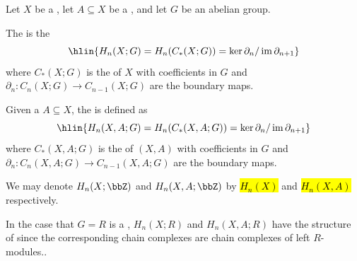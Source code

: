 \begin{definition} \label{definition:singular_homology_and_relative_singular_homology_of_topological_space_with_coefficients_in_an_abelian_group}

Let $X$ be a , let $A \subseteq X$ be a , and let $G$ be an abelian group. 

The  is the 
$$\hlin{H_n(X;G) = H_n(C_*(X;G)) = \ker \partial_n / \operatorname{im} \partial_{n+1}}$$
where $C_*(X;G)$ is the  of $X$ with coefficients in $G$ and $\partial_n: C_n(X;G) \to C_{n-1}(X;G)$ are the boundary maps.

Given a  $A \subseteq X$, the  is defined as
$$\hlin{H_n(X,A;G) = H_n(C_*(X,A;G)) = \ker \partial_n / \operatorname{im} \partial_{n+1}}$$
where $C_*(X,A;G)$ is the  of $(X,A)$ with coefficients in $G$  and $\partial_n: C_n(X,A;G) \to C_{n-1}(X,A;G)$ are the boundary maps.

We may denote $H_n(X;\bbZ)$ and $H_n(X,A;\bbZ)$ by \hl{$H_n(X)$} and \hl{$H_n(X,A)$} respectively.

In the case that $G = R$ is a , $H_n(X;R)$ and $H_n(X,A;R)$ have the structure of  since the corresponding chain complexes are chain complexes of left $R$-modules..
\end{definition}
